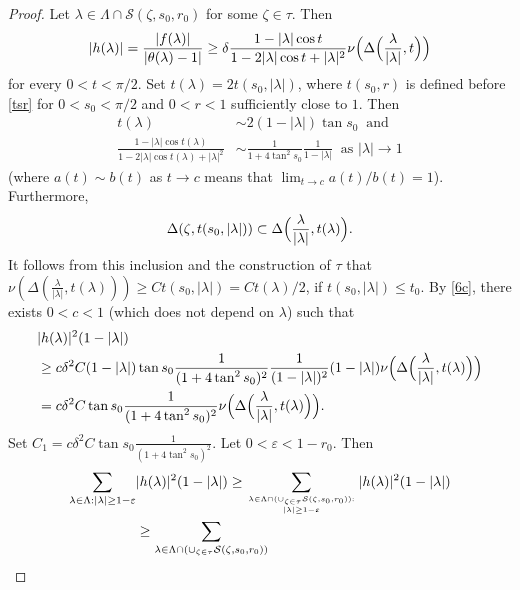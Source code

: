 \documentclass[a4paper,oneside,11pt]{amsart}
\numberwithin{equation}{section}
\theoremstyle{plain}
\theoremstyle{definition}
\begin{document}
\begin{proof}
Let $\lambda\in\Lambda\cap\mathcal S(\zeta,s_0,r_0)$ for some $\zeta\in\tau$. Then 
\begin{equation*} |h(\lambda)|=\frac{|f(\lambda)|}{|\theta(\lambda)-1|}\geq 
\delta\frac{1-|\lambda|\cos t}{1-2|\lambda|\cos t+|\lambda|^2}\nu\Bigl(\Delta\Bigl(\frac{\lambda}{|\lambda|}, t\Bigr)\Bigr)  \end{equation*}
for every  $0<t<\pi/2$. Set $t(\lambda)=2t(s_0,|\lambda|)$, where $t(s_0,r)$ is defined before \eqref{tsr} for $0<s_0<\pi/2$ and $0<r<1$ sufficiently close to $1$.  Then
\begin{equation}\label{6c} \begin{aligned}t(\lambda) & \sim 2(1-|\lambda|)\tan s_0 \ \text{ and }\\
 \frac{1-|\lambda|\cos t(\lambda) }{1-2|\lambda|\cos t(\lambda) +|\lambda|^2} & \sim \frac{1}{1+4\tan^2s_0}\frac{1}{1-|\lambda|}
 \ \text{ as } |\lambda|\to 1\end{aligned}
\end{equation}
(where $a(t)\sim b(t)$ as $t\to c$ means that $\lim_{t\to c}a(t)/b(t)=1$).
Furthermore, 
\begin{equation*} \Delta(\zeta, t(s_0,|\lambda|))\subset\Delta\Bigl(\frac{\lambda}{|\lambda|}, t(\lambda)\Bigr).
\end{equation*}
It follows from this inclusion and the  construction of $\tau$ that 
 $\nu(\Delta(\frac{\lambda}{|\lambda|}, t(\lambda)))\geq Ct(s_0,|\lambda|)=Ct(\lambda)/2$, if $t(s_0,|\lambda|)\leq t_0$. 
By \eqref{6c}, there exists $0<c<1$ (which does not depend on $\lambda$) such that 
\begin{align*} 
&|h(\lambda)|^2(1-|\lambda|)\\& 
\geq c \delta^2 C (1-|\lambda|)\tan s_0 \frac{1}{(1+4\tan^2s_0)^2}\frac{1}{(1-|\lambda|)^2}(1-|\lambda|)
\nu\Bigl(\Delta\Bigl(\frac{\lambda}{|\lambda|}, t(\lambda)\Bigr)\Bigr)\\&= c \delta^2 C \tan s_0 \frac{1}{(1+4\tan^2s_0)^2}
\nu\Bigl(\Delta\Bigl(\frac{\lambda}{|\lambda|},t(\lambda)\Bigr)\Bigr).
\end{align*}
Set $C_1=c\delta^2 C \tan s_0 \frac{1}{(1+4\tan^2s_0)^2}$. Let $0<\varepsilon<1-r_0$.
Then 
\begin{align*} 
\sum_{\lambda\in\Lambda: |\lambda|\geq 1-\varepsilon}&|h(\lambda)|^2(1-|\lambda|)\geq 
\sum_{\lambda\in\Lambda\cap(\cup_{\zeta\in\tau}\mathcal S(\zeta,s_0,r_0))
: \atop |\lambda|\geq 1-\varepsilon}|h(\lambda)|^2(1-|\lambda|) \\&
\geq \sum_{\lambda\in\Lambda\cap(\cup_{\zeta\in\tau}\mathcal S(\zeta,s_0,r_0))
}
\end{align*}
\end{proof}
\end{document}
